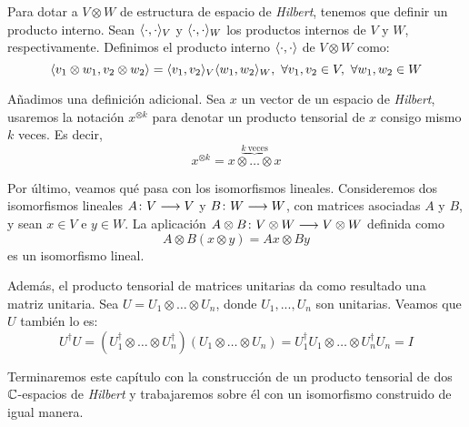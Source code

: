 Para dotar a $V\otimes W$ de estructura de espacio de \textit{Hilbert}, tenemos que definir un producto interno. Sean $\langle\cdot,\cdot\rangle_V$ y $\langle\cdot,\cdot\rangle_W$ los productos internos de $V$ y $W$, respectivamente. Definimos el producto interno $\langle\cdot,\cdot\rangle$ de $V\otimes W$ como:
$$\dotproduct{v_1\otimes w_1}{v_2\otimes w_2}=\dotproduct{v_1}{v_2}_V\dotproduct{w_1}{w_2}_W,\ \forall v_1,v_2\in V,\ \forall w_1,w_2\in W
$$

Añadimos una definición adicional. Sea $x$ un vector de un espacio de \textit{Hilbert}, usaremos la notación $x^{\otimes k}$ para denotar un producto tensorial de $x$ consigo mismo $k$ veces. Es decir,
$$x^{\otimes k}=\overset{\underbrace{k\mathrm{\ veces}}}{x\otimes \hdots \otimes x}$$

Por último, veamos qué pasa con los isomorfismos lineales. Consideremos dos isomorfismos lineales $A\colon V\longrightarrow V$ y $B\colon W\longrightarrow W$,  con matrices asociadas $A$ y $B$, y sean $x\in V$ e $y\in W$. La aplicación $A\otimes B\colon V\otimes W\longrightarrow V\otimes W$ definida como
\begin{equation}
\label{eq:eq36}
A\otimes B(x\otimes y) = Ax\otimes By
\end{equation}
es un isomorfismo lineal.

Además, el producto tensorial de matrices unitarias da como resultado una matriz unitaria. Sea $U=U_1\otimes\hdots\otimes U_n$, donde $U_1,...,U_n$ son unitarias. Veamos que $U$ también lo es:
\[U^\dag U = (U_1^\dag\otimes\hdots\otimes U_n^\dag)(U_1\otimes\hdots\otimes U_n)=U_1^\dag U_1\otimes\hdots\otimes U_n^\dag U_n = I\]

Terminaremos este capítulo con la construcción de un producto tensorial de dos $\mathbb{C}$-espacios de \textit{Hilbert} y trabajaremos sobre él con un isomorfismo construido de igual manera.


